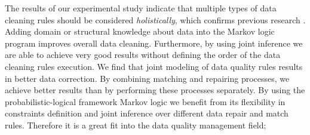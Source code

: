 The results of our experimental study indicate that multiple types of data cleaning rules should be considered \textit{holistically}, which confirms previous research \cite{Dallachiesa:2013:NCD:2463676.2465327, Fan:2014:IRM:2628135.2567657, Fan:2011:IRM:1989323.1989373}. Adding domain or structural knowledge about data into the Markov logic program improves overall data cleaning. Furthermore, by using joint inference we are able to achieve very good results without defining the order of the data cleaning rules execution. We find that joint modeling of data quality rules results in better  data correction. By combining matching and repairing processes, we achieve better  results than by performing these processes separately. By using the probabilistic-logical framework Markov logic we benefit from its flexibility in constraints definition and joint inference over different data repair and match rules. Therefore it is a great fit into the data quality management field; 


